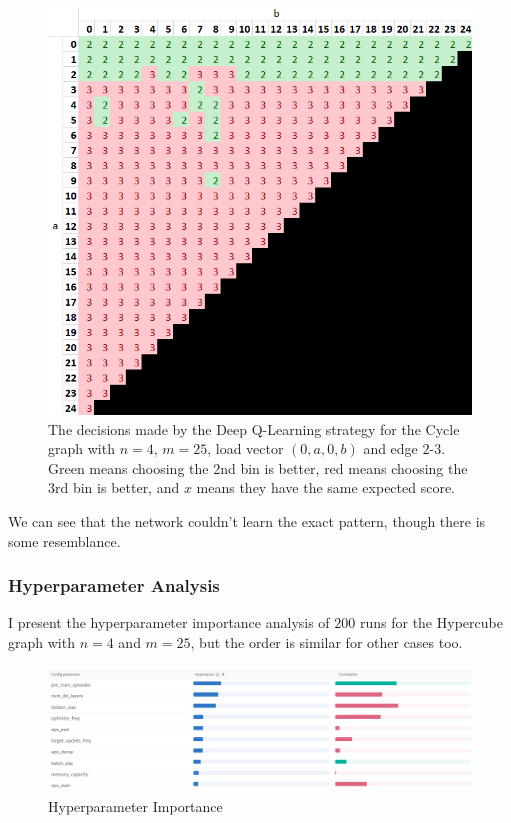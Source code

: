 \begin{figure}[hbt!] \label{greedy-counterexample-analysed-for-dqn}
    \centering
    \includegraphics[scale=1.0]{Chapter4/Figs/0a0b_4_25_analysis_dqn.png}
    \caption{The decisions made by the Deep Q-Learning strategy for the Cycle graph with $n=4$, $m=25$, load vector $(0,a,0,b)$ and edge $2$-$3$. Green means choosing the $2$nd bin is better, red means choosing the $3$rd bin is better, and $x$ means they have the same expected score.}
\end{figure}


We can see that the network couldn't learn the exact pattern, though there is some resemblance.


\subsubsection{Hyperparameter Analysis}

I present the hyperparameter importance analysis of $200$ runs for the Hypercube graph with $n=4$ and $m=25$, but the order is similar for other cases too.

\begin{figure}[hbt!] \label{graphical-two-choice-hyperparameter-importance}
    \centering
    \includegraphics[scale=0.4]{Chapter4/Figs/graphical_two_choice_hypercube_4_25_importance.png}
    \caption{\GraphicalTwoChoice Hyperparameter Importance}
\end{figure}


